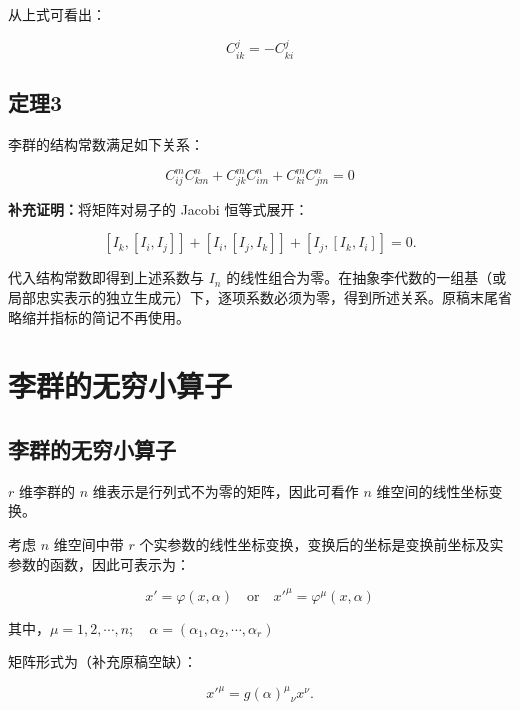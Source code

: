 从上式可看出：

\begin{equation}
C_{ik}^j = -C_{ki}^j
\end{equation}

\subsection{定理3}

李群的结构常数满足如下关系：

\begin{equation}
C_{ij}^m C_{km}^n + C_{jk}^m C_{im}^n + C_{ki}^m C_{jm}^n
=0
\end{equation}

\textbf{补充证明：}将矩阵对易子的 Jacobi 恒等式展开：

\begin{equation}
\left[I_k,\left[I_i,I_j\right]\right]+\left[I_i,\left[I_j,I_k\right]\right]+\left[I_j,\left[I_k,I_i\right]\right]=0.
\end{equation}

代入结构常数即得到上述系数与 $I_n$ 的线性组合为零。在抽象李代数的一组基（或局部忠实表示的独立生成元）下，逐项系数必须为零，得到所述关系。原稿末尾省略缩并指标的简记不再使用。

\section{李群的无穷小算子}

\subsection{李群的无穷小算子}

$r$ 维李群的 $n$ 维表示是行列式不为零的矩阵，因此可看作 $n$ 维空间的线性坐标变换。

考虑 $n$ 维空间中带 $r$ 个实参数的线性坐标变换，变换后的坐标是变换前坐标及实参数的函数，因此可表示为：

\begin{equation}
x' = \varphi\left(x,\alpha\right)\quad \mathrm{or}\quad
x'^{\mu} = \varphi^\mu\left(x,\alpha\right)
\end{equation}

其中，$\mu=1,2,\cdots,n;\quad \alpha=\left(\alpha_1,\alpha_2,\cdots,\alpha_r \right)$

矩阵形式为（补充原稿空缺）：

\begin{equation}
x'^{\mu}=g\left(\alpha\right)^{\mu}{}_{\nu}x^{\nu}.
\end{equation}

